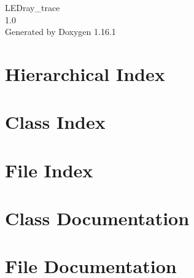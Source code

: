 \documentclass[twoside]{book}
\newcommand{\+}{\discretionary{\mbox{\scriptsize$\hookleftarrow$}}{}{}}
\newcommand{\clearemptydoublepage}{%
    \newpage{\pagestyle{empty}\cleardoublepage}%
  }
\begin{document}
  \raggedbottom
    \hypersetup{pageanchor=false,
                bookmarksnumbered=true,
                pdfencoding=unicode
               }
  \begin{titlepage}
  \vspace*{7cm}
  \begin{center}%
  {\Large LEDray\+\_\+trace}\\
  [1ex]\large 1.\+0 \\
  \vspace*{1cm}
  {\large Generated by Doxygen 1.16.1}\\
  \end{center}
  \end{titlepage}
  \clearemptydoublepage
  \tableofcontents
  \clearemptydoublepage
  \hypersetup{pageanchor=true}
\chapter{Hierarchical Index}

\chapter{Class Index}

\chapter{File Index}

\chapter{Class Documentation}











\chapter{File Documentation}













  \backmatter
  \newpage
  \clearemptydoublepage
  \printindex
\end{document}
